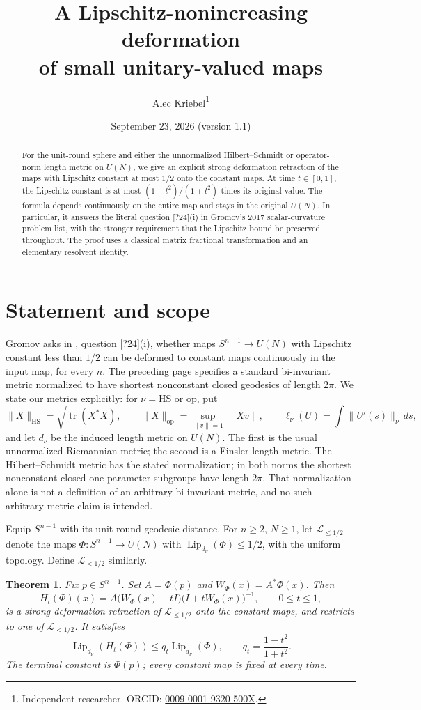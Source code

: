 \documentclass[11pt]{article}
\title{A Lipschitz-nonincreasing deformation\protect\\of small unitary-valued maps}
\author{Alec Kriebel\thanks{Independent researcher. ORCID: \href{https://orcid.org/0009-0001-9320-500X}{0009-0001-9320-500X}.}}
\date{September 23, 2026 \quad (version 1.1)}
\newtheorem{theorem}{Theorem}
\newcommand{\Lip}{\operatorname{Lip}}
\newcommand{\op}{\mathrm{op}}
\newcommand{\HS}{\mathrm{HS}}
\begin{document}
\maketitle
\begin{abstract}
For the unit-round sphere and either the unnormalized Hilbert--Schmidt or operator-norm length metric on $U(N)$, we give an explicit strong deformation retraction of the maps with Lipschitz constant at most $1/2$ onto the constant maps. At time $t\in[0,1]$, the Lipschitz constant is at most $(1-t^2)/(1+t^2)$ times its original value. The formula depends continuously on the entire map and stays in the original $U(N)$. In particular, it answers the literal question [?24](i) in Gromov's 2017 scalar-curvature problem list, with the stronger requirement that the Lipschitz bound be preserved throughout. The proof uses a classical matrix fractional transformation and an elementary resolvent identity.
\end{abstract}

\section{Statement and scope}
Gromov asks in \cite[p.~36]{gromov}, question [?24](i), whether maps $S^{n-1}\to U(N)$ with Lipschitz constant less than $1/2$ can be deformed to constant maps continuously in the input map, for every $n$. The preceding page specifies a standard bi-invariant metric normalized to have shortest nonconstant closed geodesics of length $2\pi$. We state our metrics explicitly: for $\nu=\HS$ or $\op$, put
\[
 \|X\|_{\HS}=\sqrt{\operatorname{tr}(X^*X)},\qquad
 \|X\|_{\op}=\sup_{\|v\|=1}\|Xv\|,
 \qquad \ell_\nu(U)=\int\|U'(s)\|_\nu\,ds,
\]
and let $d_\nu$ be the induced length metric on $U(N)$. The first is the usual unnormalized Riemannian metric; the second is a Finsler length metric. The Hilbert--Schmidt metric has the stated normalization; in both norms the shortest nonconstant closed one-parameter subgroups have length $2\pi$. That normalization alone is not a definition of an arbitrary bi-invariant metric, and no such arbitrary-metric claim is intended.

Equip $S^{n-1}$ with its unit-round geodesic distance. For $n\ge2$, $N\ge1$, let $\mathcal L_{\le1/2}$ denote the maps $\Phi:S^{n-1}\to U(N)$ with $\Lip_{d_\nu}(\Phi)\le1/2$, with the uniform topology. Define $\mathcal L_{<1/2}$ similarly.

\begin{theorem}\label{thm:main}
Fix $p\in S^{n-1}$. Set $A=\Phi(p)$ and $W_\Phi(x)=A^*\Phi(x)$. Then
\begin{equation}\label{eq:homotopy}
 H_t(\Phi)(x)=A\bigl(W_\Phi(x)+tI\bigr)\bigl(I+tW_\Phi(x)\bigr)^{-1},\qquad 0\le t\le1,
\end{equation}
is a strong deformation retraction of $\mathcal L_{\le1/2}$ onto the constant maps, and restricts to one of $\mathcal L_{<1/2}$. It satisfies
\begin{equation}\label{eq:rate}
 \Lip_{d_\nu}(H_t(\Phi))\le q_t\Lip_{d_\nu}(\Phi),
 \qquad q_t=\frac{1-t^2}{1+t^2}.
\end{equation}
The terminal constant is $\Phi(p)$; every constant map is fixed at every time.
\end{theorem}
\end{document}
